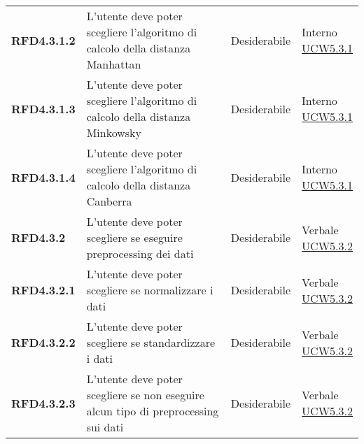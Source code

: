 \begin{longtable}[H]{| >{\raggedright\bfseries}m{20mm} | >{\raggedright}m{90mm} | >{\centering}m{25mm} | >{\centering\arraybackslash}m{30mm}|}
    RFD4.3.1.2
     & L'utente deve poter scegliere l'algoritmo di calcolo della distanza Manhattan
     & Desiderabile
     & \makecell{ Interno                                                                                                \\ \hyperref[par:ucw5.3.1]{UCW5.3.1} }\\

    RFD4.3.1.3
     & L'utente deve poter scegliere l'algoritmo di calcolo della distanza Minkowsky
     & Desiderabile
     & \makecell{ Interno                                                                                                \\ \hyperref[par:ucw5.3.1]{UCW5.3.1} }\\

    RFD4.3.1.4
     & L'utente deve poter scegliere l'algoritmo di calcolo della distanza Canberra
     & Desiderabile
     & \makecell{ Interno                                                                                                \\ \hyperref[par:ucw5.3.1]{UCW5.3.1} }\\

    RFD4.3.2
     & L'utente deve poter scegliere se eseguire preprocessing dei dati
     & Desiderabile
     & \makecell{ Verbale                                                                                                \\ \hyperref[par:ucw5.3.2]{UCW5.3.2} }\\

    RFD4.3.2.1
     & L'utente deve poter scegliere se normalizzare i dati
     & Desiderabile
     & \makecell{ Verbale                                                                                                \\ \hyperref[par:ucw5.3.2]{UCW5.3.2} }\\

    RFD4.3.2.2
     & L'utente deve poter scegliere se standardizzare i dati
     & Desiderabile
     & \makecell{ Verbale                                                                                                \\ \hyperref[par:ucw5.3.2]{UCW5.3.2} }\\

    RFD4.3.2.3
     & L'utente deve poter scegliere se non eseguire alcun tipo di preprocessing sui dati
     & Desiderabile
     & \makecell{ Verbale                                                                                                \\ \hyperref[par:ucw5.3.2]{UCW5.3.2} }\\



\end{longtable}

